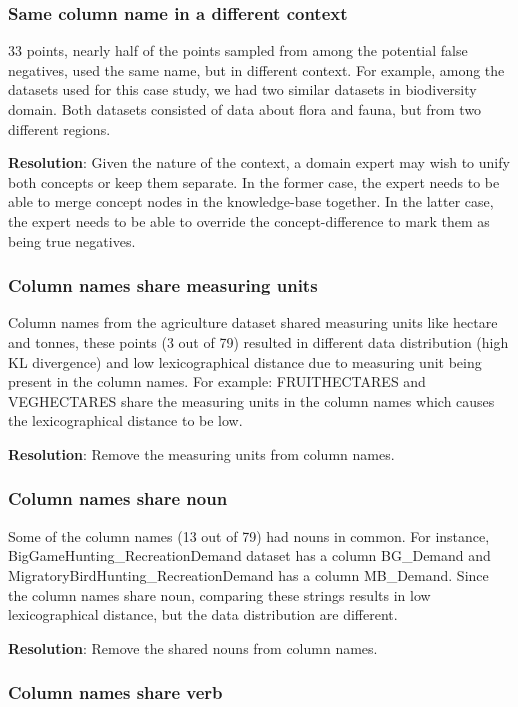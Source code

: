\subsubsection{Same column name in a different context}
33 points, nearly half of the points sampled from among the potential false negatives, used the same name, but in different context.
For example, among the datasets used for this case study, we had two similar datasets in biodiversity domain. 
Both datasets consisted of data about flora and fauna, but from two different regions.

\textbf{Resolution}: Given the nature of the context, a domain expert may wish to unify both concepts or keep them separate.
In the former case, the expert needs to be able to merge concept nodes in the knowledge-base together.  
In the latter case, the expert needs to be able to override the concept-difference to mark them as being true negatives.

\subsubsection{Column names share measuring units}
Column names from the agriculture dataset shared measuring units like hectare and tonnes, these points (3 out of 79) resulted in different data distribution (high KL divergence) and low lexicographical distance due to measuring unit being present in the column names. For example: FRUITHECTARES and VEGHECTARES share the measuring units in the column names which causes the lexicographical distance to be low.

\textbf{Resolution}: Remove the measuring units from column names.

\subsubsection{Column names share noun}
Some of the column names (13 out of 79) had nouns in common. For instance, BigGameHunting\_RecreationDemand dataset has a column BG\_Demand and MigratoryBirdHunting\_RecreationDemand has a column MB\_Demand. Since the column names share noun, comparing these strings results in low lexicographical distance, but the data distribution are different.

\textbf{Resolution}: Remove the shared nouns from column names.


\subsubsection{Column names share verb}

